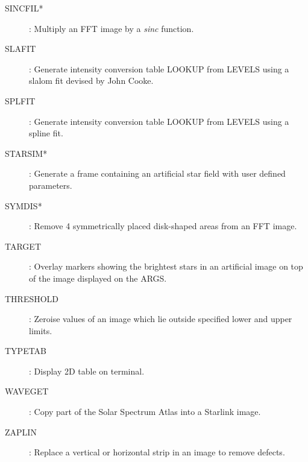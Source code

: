 \begin{description}
\begin{description}
\item [SINCFIL*]: Multiply an FFT image by a {\em sinc} function.
\item [SLAFIT]: Generate intensity conversion table LOOKUP from LEVELS using
a slalom fit devised by John Cooke.
\item [SPLFIT]: Generate intensity conversion table LOOKUP from LEVELS using a
spline fit.
\item [STARSIM*]: Generate a frame containing  an artificial star field with
user defined parameters.
\item [SYMDIS*]: Remove 4 symmetrically placed disk-shaped areas from an FFT
image.
\item [TARGET]: Overlay markers showing the brightest stars in an artificial
image on top of the image displayed on the ARGS.
\item [THRESHOLD]: Zeroise values of an image which lie outside specified
lower and upper limits.
\item [TYPETAB]: Display 2D table on terminal.
\item [WAVEGET]: Copy part of the Solar Spectrum Atlas into a Starlink image.
\item [ZAPLIN]: Replace a vertical or horizontal strip in an image to remove
defects.
\end{description}
\end{description}

